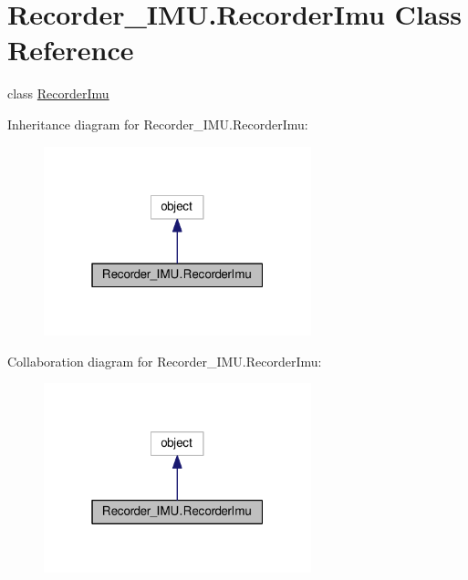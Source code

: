\hypertarget{classRecorder__IMU_1_1RecorderImu}{}\section{Recorder\+\_\+\+I\+M\+U.\+Recorder\+Imu Class Reference}
\label{classRecorder__IMU_1_1RecorderImu}


class \hyperlink{classRecorder__IMU_1_1RecorderImu}{Recorder\+Imu}  




Inheritance diagram for Recorder\+\_\+\+I\+M\+U.\+Recorder\+Imu\+:
\nopagebreak
\begin{figure}[H]
\begin{center}
\leavevmode
\includegraphics[width=220pt]{classRecorder__IMU_1_1RecorderImu__inherit__graph}
\end{center}
\end{figure}


Collaboration diagram for Recorder\+\_\+\+I\+M\+U.\+Recorder\+Imu\+:
\nopagebreak
\begin{figure}[H]
\begin{center}
\leavevmode
\includegraphics[width=220pt]{classRecorder__IMU_1_1RecorderImu__coll__graph}
\end{center}
\end{figure}
